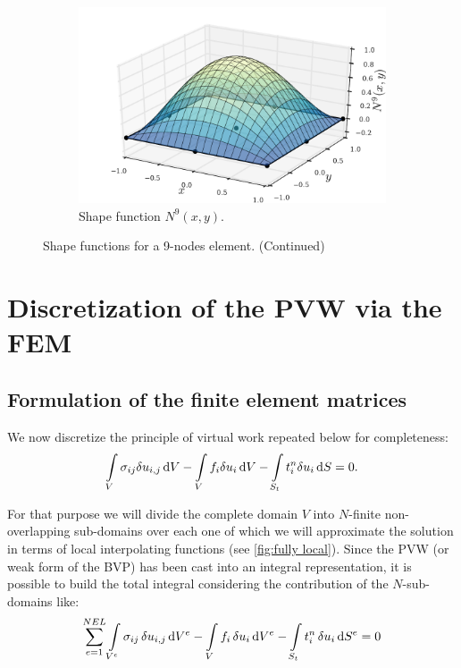 \begin{figure} [H]
\begin{subfigure}[b]{0.45\textwidth}
		\includegraphics[width=\textwidth]{shape_func-9-nodes-9.pdf}
		\caption{Shape function $N^9(x,y)$.}
	\end{subfigure}
\caption{Shape functions for a 9-nodes element. (Continued)}
\end{figure}

\section[Discretization of the PVW using FEM]{Discretization of the PVW via the FEM}
\subsection{Formulation of the finite element matrices}
We now discretize the principle of virtual work repeated below for completeness:
\begin{equation} \label{pvw_2}
\int\limits_V \sigma_{ij} \delta u_{i,j} \dd{V} - \int\limits_V f_i \delta u_i \dd{V} - \int\limits_{S_t} t_i^n \delta u_i \dd{S} = 0.
\end{equation}

For that purpose we will divide the complete domain $V$ into $N$-finite non-overlapping sub-domains over each one of which we will approximate the solution in terms of local interpolating functions (see \cref{fig:fully local}). Since the PVW (or weak form of the BVP) has been cast into an integral representation, it is possible to build the total integral considering the contribution of the $N$-sub-domains like:
\begin{equation}\label{pvw_dis}
\sum_{e=1}^{NEL} \int\limits_{V^e} \sigma_{ij} \var{u}_{i,j} \dd{V^e} - \int\limits_V f_i \var{u}_i \dd{V^e} - \int\limits_{S_t} t_i^n \var{u}_i\dd{S^e} = 0 
\end{equation}

